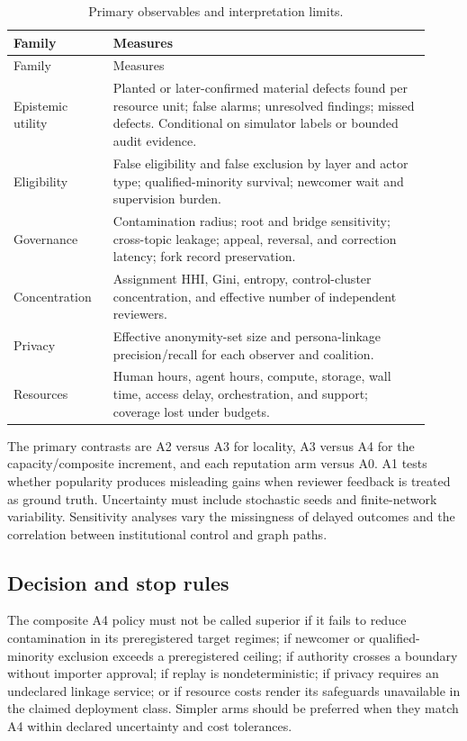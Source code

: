 \documentclass[11pt]{article}
\begin{document}
\begin{longtable}{@{}p{0.22\linewidth}p{0.70\linewidth}@{}}
\caption{Primary observables and interpretation limits.}\label{tab:observables}\\
\toprule
Family & Measures \\
\midrule
\endfirsthead
\toprule
Family & Measures \\
\midrule
\endhead
Epistemic utility & Planted or later-confirmed material defects found per resource unit; false alarms; unresolved findings; missed defects.  Conditional on simulator labels or bounded audit evidence. \\
Eligibility & False eligibility and false exclusion by layer and actor type; qualified-minority survival; newcomer wait and supervision burden. \\
Governance & Contamination radius; root and bridge sensitivity; cross-topic leakage; appeal, reversal, and correction latency; fork record preservation. \\
Concentration & Assignment HHI, Gini, entropy, control-cluster concentration, and effective number of independent reviewers. \\
Privacy & Effective anonymity-set size and persona-linkage precision/recall for each observer and coalition. \\
Resources & Human hours, agent hours, compute, storage, wall time, access delay, orchestration, and support; coverage lost under budgets. \\
\bottomrule
\end{longtable}

The primary contrasts are A2 versus A3 for locality, A3 versus A4 for the capacity/composite increment, and each reputation arm versus A0.  A1 tests whether popularity produces misleading gains when reviewer feedback is treated as ground truth.  Uncertainty must include stochastic seeds and finite-network variability.  Sensitivity analyses vary the missingness of delayed outcomes and the correlation between institutional control and graph paths.

\subsection{Decision and stop rules}

The composite A4 policy must not be called superior if it fails to reduce contamination in its preregistered target regimes; if newcomer or qualified-minority exclusion exceeds a preregistered ceiling; if authority crosses a boundary without importer approval; if replay is nondeterministic; if privacy requires an undeclared linkage service; or if resource costs render its safeguards unavailable in the claimed deployment class.  Simpler arms should be preferred when they match A4 within declared uncertainty and cost tolerances.
\end{document}
